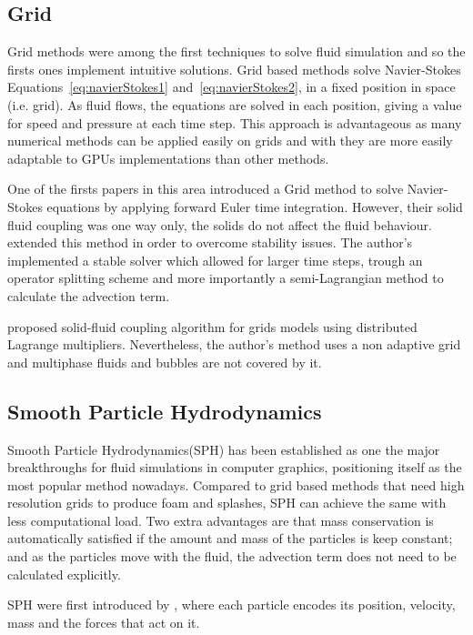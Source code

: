 \subsection{Grid}
\label{gridFluidSolvers}

Grid methods were among the first techniques to solve fluid simulation and so the firsts ones implement intuitive solutions.
Grid based methods solve Navier-Stokes Equations~\ref{eq:navierStokes1} and~\ref{eq:navierStokes2}, in a fixed position in space (i.e. grid).
As fluid flows, the equations are solved in each position, giving a value for speed and pressure at each time step.
This approach is advantageous as many numerical methods can be applied easily on grids and with they are more easily adaptable to GPUs implementations than other methods.

One of the firsts papers in this area introduced a Grid method \cite{Foster1996} to solve Navier-Stokes equations by applying forward Euler time integration.
However, their solid fluid coupling was one way only, the solids do not affect the fluid behaviour.
\cite{Stam1999} extended this method in order to overcome stability issues.
The author's implemented a stable solver which allowed for larger time steps, trough an operator splitting scheme and more importantly a semi-Lagrangian method to calculate the advection term.

\cite{Carlson2004} proposed solid-fluid coupling algorithm for grids models using distributed Lagrange multipliers.
Nevertheless, the author's method uses  a non adaptive grid and multiphase fluids and bubbles are not covered by it.

\subsection{Smooth Particle Hydrodynamics}

Smooth Particle Hydrodynamics(SPH) has been established as one the major breakthroughs for fluid simulations in computer graphics, positioning itself as the most popular method nowadays.
Compared to grid based methods that need high resolution grids to produce foam and splashes, SPH can achieve the same with less computational load.
Two extra advantages are that mass conservation is automatically satisfied if the amount and mass of the particles is keep constant;
and as the particles move with the fluid, the advection term does not need to be calculated explicitly.

SPH were first introduced by \cite{DesbrunMathieuandGascuel1996}, where each particle encodes its position, velocity, mass and the forces that act on it.

